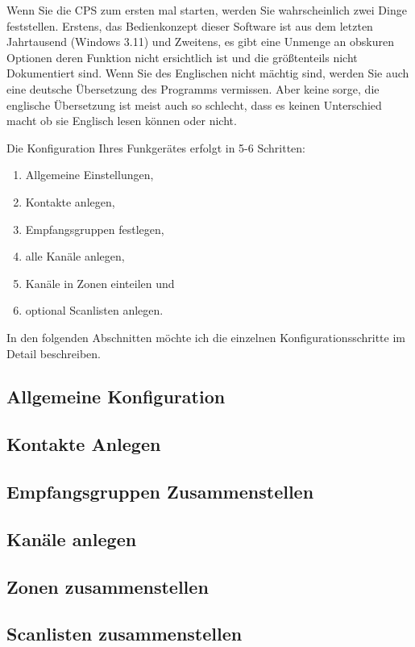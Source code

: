 Wenn Sie die CPS zum ersten mal starten, werden Sie wahrscheinlich zwei Dinge feststellen. Erstens, das Bedienkonzept dieser Software ist aus dem letzten Jahrtausend (Windows 3.11) und Zweitens, es gibt eine Unmenge an obskuren Optionen deren Funktion nicht ersichtlich ist und die größtenteils nicht Dokumentiert sind. Wenn Sie des Englischen nicht mächtig sind, werden Sie auch eine deutsche Übersetzung des Programms vermissen. Aber keine sorge, die englische Übersetzung ist meist auch so schlecht, dass es keinen Unterschied macht ob sie Englisch lesen können oder nicht.

Die Konfiguration Ihres Funkgerätes erfolgt in 5-6 Schritten:
\begin{enumerate}
 \item Allgemeine Einstellungen,
 \item Kontakte anlegen,
 \item Empfangsgruppen festlegen,
 \item alle Kanäle anlegen,
 \item Kanäle in Zonen einteilen und
 \item optional Scanlisten anlegen.
\end{enumerate}

In den folgenden Abschnitten möchte ich die einzelnen Konfigurationsschritte im Detail beschreiben.

\subsection{Allgemeine Konfiguration}

\subsection{Kontakte Anlegen}

\subsection{Empfangsgruppen Zusammenstellen}

\subsection{Kanäle anlegen}

\subsection{Zonen zusammenstellen}

\subsection{Scanlisten zusammenstellen}